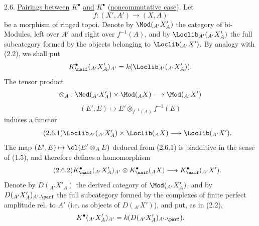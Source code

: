 2.6. \uline{Pairings between} \(K^{\bullet}\) \uline{and} \(K^{\bullet}\) (\uline{noncommutative case}). Let
\[
 f:(X',A')\longrightarrow (X,A)
\]
be a morphism of ringed topoi. Denote by \(\Mod({}_{A'} X'_A)\) the category of bi-Modules, left over \(A'\) and right over \(f^{-1}(A)\), and by \(\Loclib_{A'}({}_{A'} X'_A)\) the full subcategory formed by the objects belonging to \(\Loclib({}_{A'} X')\). By analogy with (2.2), we shall put
\[
 K^{\bullet}_{\naif}({}_{A'} X'_A)_{A'}=k(\Loclib_{A'}({}_{A'} X'_A)).
\]
The tensor product
\[
 \otimes_A:\Mod({}_{A'} X'_A)\times\Mod({}_A X)\longrightarrow \Mod({}_{A'} X')
\]
\[
 (E',E)\longmapsto E'\otimes_{f^{-1}(A)}f^{-1}(E)
\]
induces a functor
\begin{equation}\tag{2.6.1}
 \Loclib_{A'}({}_{A'} X'_A)\times\Loclib({}_A X)\longrightarrow\Loclib({}_{A'} X').
\end{equation}
The map \((E',E)\mapsto\cl(E'\otimes_A E)\) deduced from (2.6.1) is biadditive in the sense of (1.5), and therefore defines a homomorphism
\begin{equation}\tag{2.6.2}
 K^{\bullet}_{\naif}({}_{A'} X'_A)_{A'}\otimes K^{\bullet}_{\naif}({}_A X)\longrightarrow K^{\bullet}_{\naif}({}_{A'} X').
\end{equation}
Denote by \(D({}_{A'} X'_A)\) the derived category of \(\Mod({}_{A'} X'_A)\), and by \(D({}_{A'} X'_A)_{A'\text{-}\parf}\) the full subcategory formed by the complexes of finite perfect amplitude rel. to \(A'\) (i.e. as objects of \(D({}_{A'} X')\)), and put, as in (2.2),
\[
 K^{\bullet}({}_{A'} X'_A)_{A'}=k(D({}_{A'} X'_A)_{A'\text{-}\parf}).
\]

